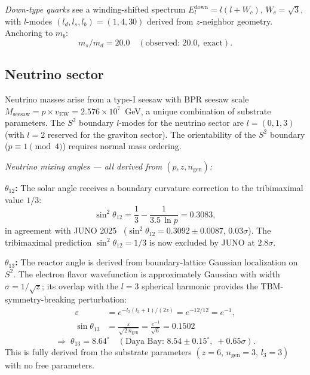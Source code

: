 \documentclass[aps,prd,twocolumn,superscriptaddress,longbibliography,nofootinbib]{revtex4-2}
\newcommand{\Stwo}{S^2}
\newcommand{\vEW}{v_{\mathrm{EW}}}
\begin{document}
\textit{Down-type quarks} see a winding-shifted spectrum
$E_l^{\mathrm{down}} = l(l+W_c)$, $W_c = \sqrt{3}$,
with $l$-modes $(l_d, l_s, l_b) = (1, 4, 30)$ derived from $z$-neighbor
geometry.  Anchoring to $m_b$:
\begin{equation}
m_s/m_d = 20.0 \quad (\text{observed: }20.0,\; \text{exact}).
\end{equation}

\subsection{Neutrino sector}
\label{sec:neutrino}

Neutrino masses arise from a type-I seesaw with BPR seesaw scale
$M_{\mathrm{seesaw}} = p \times \vEW = 2.576 \times 10^7$~GeV, a
unique combination of substrate parameters.
The $\Stwo$ boundary $l$-modes for the neutrino sector are
$l = (0, 1, 3)$ (with $l = 2$ reserved for the graviton sector).
The orientability of the $\Stwo$ boundary ($p \equiv 1 \pmod{4}$) requires
normal mass ordering.

\textit{Neutrino mixing angles --- all derived from $(p, z, n_{\mathrm{gen}})$:}

\textbf{$\theta_{12}$:} The solar angle receives a boundary curvature
correction to the tribimaximal value $1/3$:
\begin{equation}
\sin^2\theta_{12} = \frac{1}{3} - \frac{1}{3.5\,\ln p} = 0.3083,
\label{eq:theta12}
\end{equation}
in agreement with JUNO 2025~\cite{JUNO2025}
($\sin^2\theta_{12} = 0.3092 \pm 0.0087$, $0.03\sigma$).
The tribimaximal prediction $\sin^2\theta_{12} = 1/3$ is now excluded
by JUNO at $2.8\sigma$.

\textbf{$\theta_{13}$:} The reactor angle is derived from boundary-lattice
Gaussian localization on $\Stwo$.  The electron flavor wavefunction is
approximately Gaussian with width $\sigma = 1/\!\sqrt{z}$; its overlap
with the $l = 3$ spherical harmonic provides the TBM-symmetry-breaking
perturbation:
\begin{align}
\varepsilon &= e^{-l_3(l_3+1)/(2z)}
             = e^{-12/12} = e^{-1}, \\
\sin\theta_{13} &= \frac{\varepsilon}{\sqrt{2\,n_{\mathrm{gen}}}}
                 = \frac{e^{-1}}{\sqrt{6}} = 0.1502
\label{eq:theta13}
\end{align}
\begin{equation}
\Longrightarrow\; \theta_{13} = 8.64^\circ
\quad (\text{Daya Bay: }8.54 \pm 0.15^\circ,\; +0.65\sigma).
\end{equation}
This is fully derived from the substrate parameters $(z = 6,\,
n_{\mathrm{gen}} = 3,\, l_3 = 3)$ with no free parameters.
\end{document}
